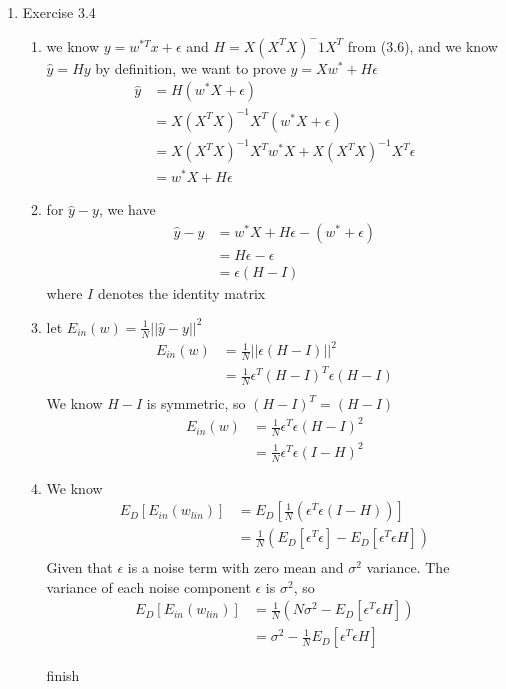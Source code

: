 \documentclass{article}
\begin{document}
    \begin{enumerate}
        \item Exercise 3.4
        \begin{enumerate}[label=(\alph*)]
            \item we know $y = w^{*T}x + \epsilon$ and $H = X(X^TX)^-1X^T$ from (3.6), and we know $\hat{y} = Hy$ by definition, we want to prove $\hat{y} = Xw^* + H\epsilon$
            \begin{align*}
                \hat{y} &= H(w^*X + \epsilon)\\
                &= X(X^TX)^{-1}X^T(w^*X+\epsilon)\\
                &= X(X^TX)^{-1}X^Tw^*X + X(X^TX)^{-1}X^T\epsilon\\
                &= w^*X + H\epsilon
            \end{align*}

            \item for $\hat{y} - y$, we have
            \begin{align*}
                \hat{y} - y &= w^*X + H\epsilon - (w^* + \epsilon)\\
                &= H\epsilon - \epsilon\\
                &= \epsilon(H - I)
            \end{align*}
            where $I$ denotes the identity matrix

            \item let $E_{in}(w) = \frac{1}{N} ||\hat{y} - y||^2$
            \begin{align*}
                E_{in}(w) &= \frac{1}{N}||\epsilon(H-I)||^2\\
                &= \frac{1}{N}\epsilon^T(H-I)^T\epsilon(H-I)\\
            \end{align*}
            We know $H - I$ is symmetric, so $(H-I)^T = (H-I)$
            \begin{align*}
                E_{in}(w) &= \frac{1}{N}\epsilon^T\epsilon(H-I)^2\\
                &= \frac{1}{N}\epsilon^T\epsilon(I - H)^2
            \end{align*}

            \item We know
            \begin{align*}
                E_D[E_{in}(w_{lin})] &= E_D[\frac{1}{N}(\epsilon^T\epsilon(I - H))]\\
                &= \frac{1}{N} (E_D[\epsilon^T\epsilon] - E_D[\epsilon^T\epsilon H])\\
            \end{align*}
            Given that $\epsilon$ is a noise term with zero mean and $\sigma^2$ variance. The variance of each noise component $\epsilon$ is $\sigma^2$, so 
            \begin{align*}
                E_D[E_{in}(w_{lin})] &= \frac{1}{N}(N\sigma^2 - E_D[\epsilon^T\epsilon H])\\
                &= \sigma^2 - \frac{1}{N}E_D[\epsilon^T\epsilon H]
            \end{align*}

            finish
        \end{enumerate}
    \end{enumerate}
\end{document}
